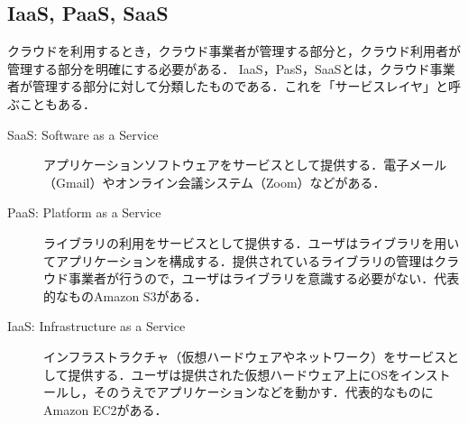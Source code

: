 \subsection{IaaS, PaaS, SaaS}
クラウドを利用するとき，クラウド事業者が管理する部分と，クラウド利用者が管理する部分を明確にする必要がある．
IaaS，PasS，SaaSとは，クラウド事業者が管理する部分に対して分類したものである．これを「サービスレイヤ」と呼ぶこともある．
\begin{description}
    \item[SaaS: Software as a Service] アプリケーションソフトウェアをサービスとして提供する．電子メール（Gmail）やオンライン会議システム（Zoom）などがある．
    \item[PaaS: Platform as a Service] ライブラリの利用をサービスとして提供する．ユーザはライブラリを用いてアプリケーションを構成する．提供されているライブラリの管理はクラウド事業者が行うので，ユーザはライブラリを意識する必要がない．代表的なものAmazon S3がある．
    \item[IaaS: Infrastructure as a Service] インフラストラクチャ（仮想ハードウェアやネットワーク）をサービスとして提供する．ユーザは提供された仮想ハードウェア上にOSをインストールし，そのうえでアプリケーションなどを動かす．代表的なものにAmazon EC2がある．
\end{description}
\begin{flushright}
    \cite[p.164]{オペレーティングシステム}
\end{flushright}
